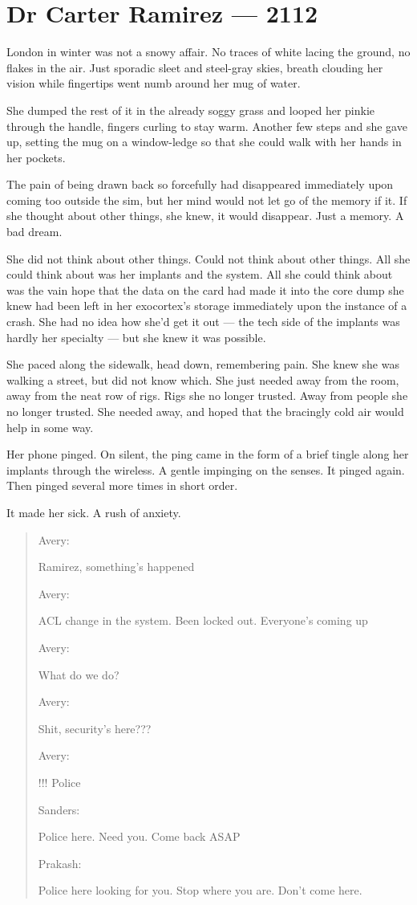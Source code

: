\hypertarget{dr-carter-ramirez-2112}{%
\chapter*{Dr Carter Ramirez — 2112}\label{dr-carter-ramirez-2112}}

London in winter was not a snowy affair. No traces of white lacing the ground, no flakes in the air. Just sporadic sleet and steel-gray skies, breath clouding her vision while fingertips went numb around her mug of water.

She dumped the rest of it in the already soggy grass and looped her pinkie through the handle, fingers curling to stay warm. Another few steps and she gave up, setting the mug on a window-ledge so that she could walk with her hands in her pockets.

The pain of being drawn back so forcefully had disappeared immediately upon coming too outside the sim, but her mind would not let go of the memory if it. If she thought about other things, she knew, it would disappear. Just a memory. A bad dream.

She did not think about other things. Could not think about other things. All she could think about was her implants and the system. All she could think about was the vain hope that the data on the card had made it into the core dump she knew had been left in her exocortex's storage immediately upon the instance of a crash. She had no idea how she'd get it out — the tech side of the implants was hardly her specialty — but she knew it was possible.

She paced along the sidewalk, head down, remembering pain. She knew she was walking a street, but did not know which. She just needed away from the room, away from the neat row of rigs. Rigs she no longer trusted. Away from people she no longer trusted. She needed away, and hoped that the bracingly cold air would help in some way.

Her phone pinged. On silent, the ping came in the form of a brief tingle along her implants through the wireless. A gentle impinging on the senses. It pinged again. Then pinged several more times in short order.

It made her sick. A rush of anxiety.

\begin{quote}
Avery:

Ramirez, something's happened

Avery:

ACL change in the system. Been locked out. Everyone's coming up

Avery:

What do we do?

Avery:

Shit, security's here???

Avery:

!!! Police

Sanders:

Police here. Need you. Come back ASAP

Prakash:

Police here looking for you. Stop where you are. Don't come here.
\end{quote}

